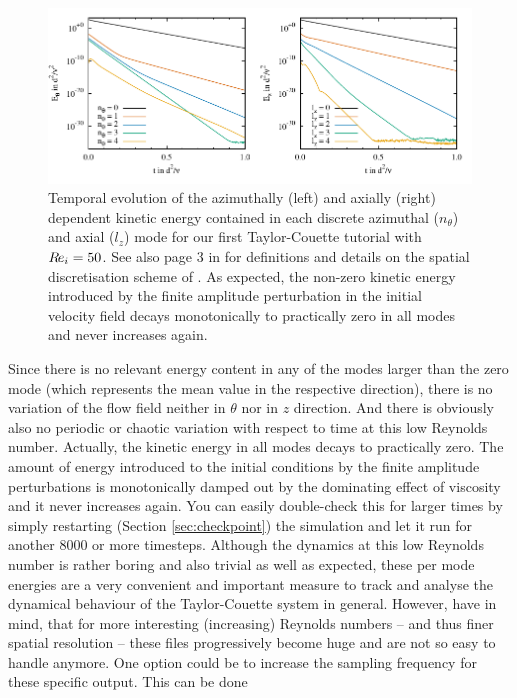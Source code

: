 \documentclass[a4paper, 11pt, DIV=11]{scrartcl}
\begin{document}
\begin{figure}[htb]
\centering
\includegraphics[scale=1.00]{figures/tc0040/keThZ.pdf}
\caption{Temporal evolution of the azimuthally (left) and axially (right)
dependent kinetic energy contained in each discrete azimuthal ($n_{\theta}$)
and axial ($l_{z}$) mode for our first Taylor-Couette tutorial 
with $R\hspace{-0.1em}e_{i}=\num{50}$. See also page 3 in \cite{Shi2015} for definitions and
details on the spatial discretisation scheme of \nsc. As expected, the non-zero
kinetic energy introduced by the finite amplitude perturbation in the initial
velocity field decays monotonically to practically zero in all modes and never
increases again.}
\label{fig:tc0040keThZ}
\end{figure}
Since there is no relevant energy content in any of the modes larger than the zero
mode (which represents the mean value in the respective direction), there is no
variation of the flow field neither in $\theta$ nor in $z$ direction. And there is
obviously also no periodic or chaotic variation with respect to time at this low
Reynolds number. Actually, the kinetic energy in all modes decays to practically
zero. The amount of energy introduced to the initial conditions by the finite amplitude
perturbations is monotonically damped out by the dominating effect of viscosity and it
never increases again. You can easily double-check this for larger times by simply
restarting (Section \ref{sec:checkpoint}) the simulation and let it run for another
\num{8000} or more timesteps. Although the dynamics at this low Reynolds number is
rather boring and also trivial as well as expected, these per mode energies are a
very convenient and important measure to track and analyse the dynamical behaviour
of the Taylor-Couette system in general. However, have in mind, that for more
interesting (\ie increasing) Reynolds numbers -- and thus finer spatial resolution -- these
files progressively become huge and are not so easy to handle anymore. One option
could be to increase the sampling frequency for these specific output. This can be done
\end{document}
